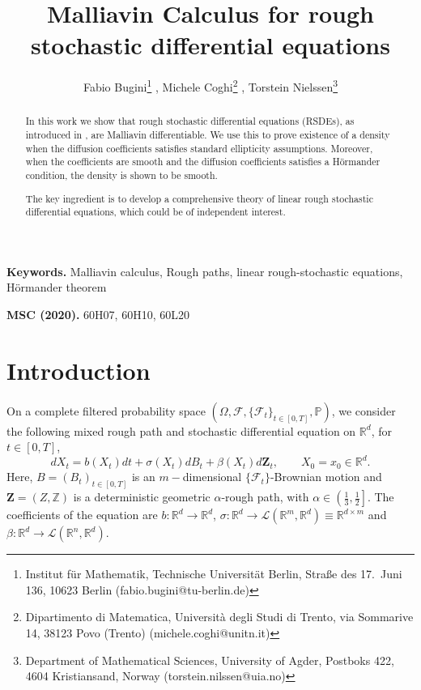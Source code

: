 \documentclass[11pt,a4paper]{article}
\title{Malliavin Calculus for rough stochastic differential equations}
\author{Fabio Bugini\thanks{
Institut für Mathematik, Technische Universität Berlin, Straße des 17.\ Juni 136, 10623 Berlin (fabio.bugini@tu-berlin.de)} , Michele Coghi\thanks{Dipartimento di Matematica, Università degli Studi di Trento, via Sommarive 14, 38123 Povo (Trento) (michele.coghi@unitn.it)} , Torstein Nielssen\thanks{Department of Mathematical Sciences, University of Agder, Postboks 422, 4604 Kristiansand, Norway (torstein.nilssen@uia.no)}}
\newcommand{\R}{\mathbb{R}}
\theoremstyle{plain}
\begin{document}
\maketitle

\begin{abstract}
In this work we show that rough stochastic differential equations (RSDEs), as introduced in \cite{FHL21}, are Malliavin differentiable.
We use this to prove existence of a density when the diffusion coefficients satisfies standard ellipticity assumptions. Moreover, when the coefficients are smooth and the diffusion coefficients satisfies a H\"{o}rmander condition, the density is shown to be smooth. 

The key ingredient is to develop a comprehensive theory of linear rough stochastic differential equations, which could be of independent interest. 
\end{abstract}

\smallskip
\noindent \textbf{Keywords.} Malliavin calculus, Rough paths, linear rough-stochastic equations, Hörmander theorem

\smallskip
\noindent \textbf{MSC (2020).} 60H07, 60H10, 60L20


\tableofcontents

\section{Introduction}
On a complete filtered probability space $(\Omega,\mathcal{F},\{\mathcal{F}_t\}_{t \in [0,T]}, \mathbb{P})$, we consider the following mixed rough path and stochastic differential equation on $\R^d$, for $t\in [0,T]$,
\begin{equation} \label{eq:RSDE_intro}
dX_t=b(X_t)dt+\sigma(X_t)dB_t+\beta(X_t)d\mathbf{Z}_t, \qquad X_0 = x_0 \in \R^d.
\end{equation} 
Here, $B=(B_t)_{t \in [0,T]}$ is an $m-$dimensional $\{\mathcal{F}_t\}$-Brownian motion and $\mathbf{Z}=(Z,\mathbb{Z})$ is a deterministic geometric $\alpha$-rough path, with $\alpha \in \left(\frac{1}{3},\frac{1}{2}\right]$.  
The coefficients of the equation are $b:\R^d\to\R^d$, $\sigma:\R^d\to\mathscr{L}(\R^m,\R^d)\equiv \R^{d \times m}$ and $\beta:\R^d\to\mathscr{L}(\R^n,\R^d)$.

\end{document}
